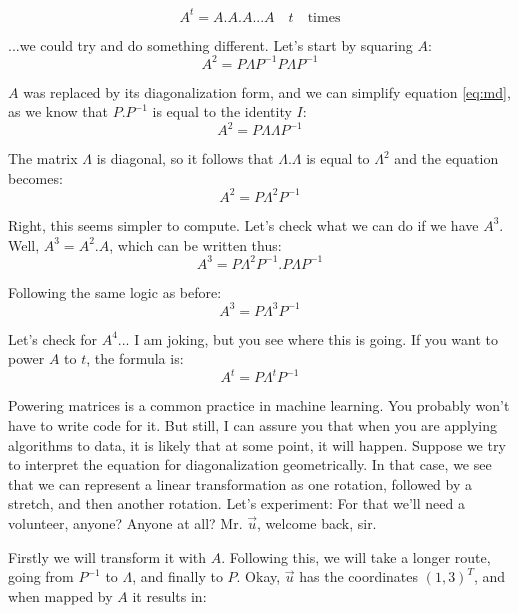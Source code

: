 \documentclass[a4,12pt,twosided,openany]{memoir}
\begin{document}
\[A^t = A.A.A...A \quad t \quad \textrm{times}\]
\par 
\indent
...we could try and do something different. Let’s start by squaring $A$:
\begin{equation}\label{eq:md}
A^2  = P \Lambda P^{-1} P \Lambda P^{-1}
\end{equation}
\par 
\indent
$A$ was replaced by its diagonalization form, and we can simplify equation \ref{eq:md}, as we know that $P.P^{-1}$ is equal to the identity $I$:
\[A^2  = P \Lambda \Lambda P^{-1}\]
\par 
\indent
The matrix $\Lambda$ is diagonal, so it follows that $\Lambda$.$\Lambda$ is equal to $\Lambda^2$ and the equation becomes:
\[A^2  = P \Lambda^2 P^{-1}\]
\par 
\indent
Right, this seems simpler to compute. Let’s check what we can do if we have $A^3$. Well, $A^3 = A^2.A$, which can be written thus:
\[A^3  = P \Lambda^2 P^{-1}. P \Lambda P^{-1}\]
\par 
\indent
Following the same logic as before:
\[A^3  = P \Lambda^3 P^{-1}\]
\par 
\indent
Let’s check for $A^4$... I am joking, but you see where this is going. If you want to power $A$ to $t$, the formula is:
\[A^t =  P \Lambda^t P^{-1}\]
\par 
\indent
Powering matrices is a common practice in machine learning. You probably won’t have to write code for it. But still, I can assure you that when you are applying algorithms to data, it is likely that at some point, it will happen. Suppose we try to interpret the equation for diagonalization geometrically. In that case, we see that we can represent a linear transformation as one rotation, followed by a stretch, and then another rotation. Let’s experiment: For that we’ll need a volunteer, anyone? Anyone at all? Mr. $\overrightarrow{u}$, welcome back, sir. 
\par 
\indent
Firstly we will transform it with $A$. Following this, we will take a longer route, going from $P^{−1}$ to $\Lambda$, and finally to $P$. Okay, $\overrightarrow{u}$ has the coordinates $(1,3)^T$, and when mapped by $A$ it results in:
\end{document}
